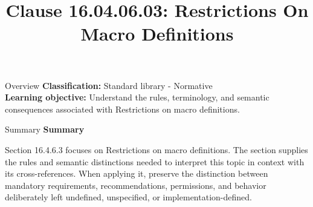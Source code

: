 \documentclass[10pt,letterpaper]{article}
\title{Clause 16.04.06.03: Restrictions On Macro Definitions}
\author{}
\date{}
\begin{document}
\maketitle
\begin{CornellOverviewBox}{Overview}
\textbf{Classification:} Standard library - Normative\\[2pt]
\textbf{Learning objective:} Understand the rules, terminology, and semantic consequences associated with Restrictions on macro definitions.
\end{CornellOverviewBox}\begin{CornellSummaryBox}{Summary}
{\sffamily\bfseries\color{Accent} Summary}\par\vspace{3pt}Section 16.4.6.3 focuses on Restrictions on macro definitions. The section supplies the rules and semantic distinctions needed to interpret this topic in context with its cross-references. When applying it, preserve the distinction between mandatory requirements, recommendations, permissions, and behavior deliberately left undefined, unspecified, or implementation-defined.
\end{CornellSummaryBox}
\end{document}
